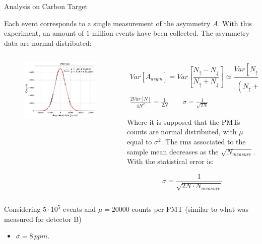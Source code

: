 \documentclass[9pt,a4paper]{beamer}
\begin{document}
\begin{frame}[t]{Analysis on Carbon Target}

Each event corresponds to a single measurement of the asymmetry $A$. With this experiment, an amount of $1$ million events have been collected. The asymmetry data are normal distributed:

\begin{columns}
\begin{column}{0.5\textwidth}
\begin{figure}
\includegraphics[width = \textwidth]{figures/B0.pdf}
\end{figure}
\end{column}
\begin{column}{0.5\textwidth}
\begin{gather*}
Var[A_{asym}] = Var[\dfrac{N_{\uparrow} - N_{\downarrow}}{ N_{\uparrow} + N_{\downarrow}}] \simeq \dfrac{Var[N_{\uparrow} - N_{\downarrow}]}{(N_{\uparrow} + N_{\downarrow})^{2}} \\
\frac{2Var[N]}{4N^{2}} = \frac{1}{2N} \qquad \sigma = \frac{1}{\sqrt{2N}}
\end{gather*}

Where it is supposed that the PMTs counts are normal distributed, with $\mu$ equal to $\sigma^{2}$. The rms associated to the sample mean decreases as the $\sqrt{N_{measure}}$. With the statistical error is:

\begin{equation}
\sigma = \dfrac{1}{\sqrt{2 N \cdot N_{measure}}} 
\end{equation}
\end{column}
\end{columns}

Considering $5\cdot 10^{5}$ events and $\mu = 20000$ counts per PMT (similar to what was measured for detector B) 

\begin{itemize}
\centering
\item $\sigma = 8 \, ppm$.
\end{itemize}
\end{frame}
\end{document}
